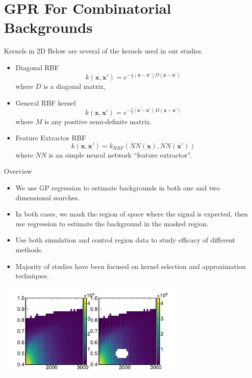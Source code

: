 \documentclass[10pt]{beamer}
\begin{document}
\section[Regression Results]{GPR For Combinatorial Backgrounds}
\label{sec:2d-gauss-proc}

\begin{frame}{Kernels in 2D}
  Below are several  of the kernels used in our studies.
  \begin{itemize}
  \item Diagonal RBF
    \begin{equation}
      k(\bm{x},\bm{x'}) = e^{ -\frac{1}{2} \left(  \bm{x} - \bm{x'}\right) D \left(  \bm{x} - \bm{x'}\right)}
    \end{equation}
    where $D$ is a diagonal matrix,
  \item General RBF kernel
    \begin{equation}
      k(\bm{x},\bm{x'}) = e^{ -\frac{1}{2} \left(  \bm{x} - \bm{x'}\right) M \left(  \bm{x} - \bm{x'}\right)}
    \end{equation}
    where $M$ is any positive semi-definite matrix.
  \item Feature Extractor RBF
    \begin{equation}
      k(\bm{x},\bm{x'}) =  k_{RBF}(NN(\bm{x}),NN(\bm{x'}))
    \end{equation}
    where $NN$ is an simple neural network ``feature extractor''.
  \end{itemize}
\end{frame}


\begin{frame}{Overview}
  \begin{itemize}
  \item We use GP regression to estimate backgrounds in both one and two dimensional searches.
  \item In both cases, we mask the region of space where the signal is expected, then use regression to estimate the background in the masked region.
  \item Use both simulation and control region data to study efficacy of different methods. 
  \item Majority of studies have been focused on kernel selection and approximation techniques.
  \end{itemize}
  \begin{center}
    \includegraphics[width=0.7\textwidth]{figures/example_masking}
  \end{center}
\end{frame}
\end{document}
